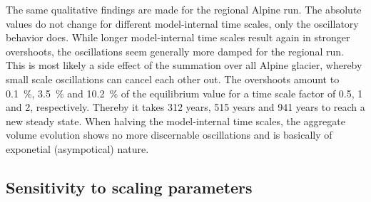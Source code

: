     The same qualitative findings are made for the regional Alpine run. The absolute values do not change for different model-internal time scales, only the oscillatory behavior does. While longer model-internal time scales result again in stronger overshoots, the oscillations seem generally more damped for the regional run. This is most likely a side effect of the summation over all Alpine glacier, whereby small scale oscillations can cancel each other out. The overshoots amount to \SI{0.1}{\percent}, \SI{3.5}{\percent} and \SI{10.2}{\percent} of the equilibrium value for a time scale factor of 0.5, 1 and 2, respectively. Thereby it takes 312 years, 515 years and 941 years to reach a new steady state. When halving the model-internal time scales, the aggregate volume evolution shows no more discernable oscillations and is basically of exponetial (asympotical) nature.


  \subsection{Sensitivity to scaling parameters} %
  \label{sec:sensitivity_to_scaling_parameters_results}

